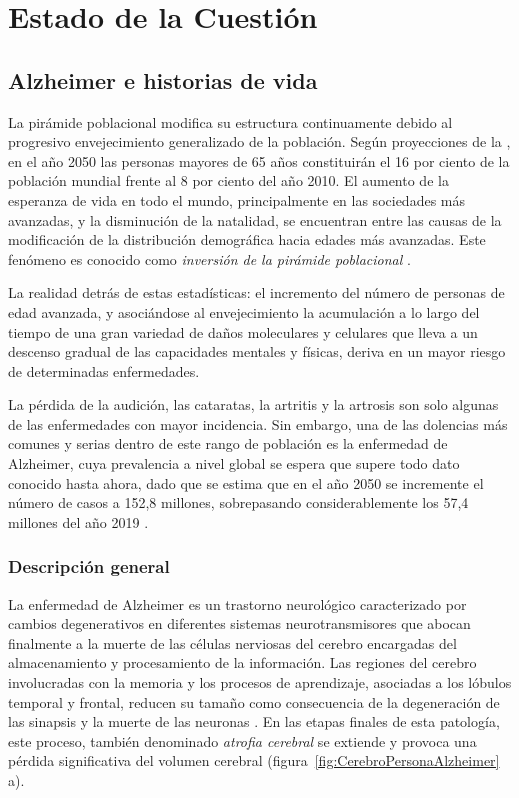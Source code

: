 \chapter{Estado de la Cuestión}
\label{cap:estadoDeLaCuestion}


\section{Alzheimer e historias de vida}
La pirámide poblacional modifica su estructura continuamente debido al progresivo envejecimiento generalizado de la población. Según proyecciones de la \cite{estalz}, en el año 2050 las personas mayores de 65 años constituirán el 16 por ciento de la población mundial frente al 8 por ciento del año 2010. El aumento de la esperanza de vida en todo el mundo, principalmente en las sociedades más avanzadas, y la disminución de la natalidad, se encuentran entre las causas de la modificación de la distribución demográfica hacia edades más avanzadas. Este fenómeno es conocido como \textit{inversión de la pirámide poblacional} \citep{RCSP892}.

La realidad detrás de estas estadísticas: el incremento del número de personas de edad avanzada, y asociándose al envejecimiento la acumulación a lo largo del tiempo de una gran variedad de daños moleculares y celulares que lleva a un descenso gradual de las capacidades mentales y físicas, deriva en un mayor riesgo de determinadas enfermedades. 

La pérdida de la audición, las cataratas, la artritis y la artrosis son solo algunas de las enfermedades con mayor incidencia. Sin embargo, una de las dolencias más comunes y serias dentro de este rango de población es la enfermedad de Alzheimer, cuya prevalencia a nivel global se espera que supere todo dato conocido hasta ahora, dado que se estima que en el año 2050 se incremente el número de casos a 152,8 millones, sobrepasando considerablemente los 57,4 millones del año 2019 \citep{alzheimers_disease_international_2019}.


\subsection{Descripción general}
La enfermedad de Alzheimer es un trastorno neurológico caracterizado por cambios degenerativos en diferentes sistemas neurotransmisores que abocan finalmente a la muerte de las células nerviosas del cerebro encargadas del almacenamiento y procesamiento de la información. Las regiones del cerebro involucradas con la memoria y los procesos de aprendizaje, asociadas a los lóbulos temporal y frontal, reducen su tamaño como consecuencia de la degeneración de las sinapsis y la muerte de las neuronas \citep{romano2007enfermedad,mattson2004pathways}. En las etapas finales de esta patología, este proceso, también denominado \textit{atrofia cerebral} se extiende y provoca una pérdida significativa del volumen cerebral (figura~\ref{fig:CerebroPersonaAlzheimer} a).


